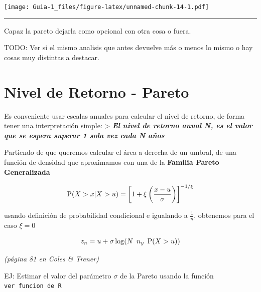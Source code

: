\documentclass[
]{article}
\begin{document}
\texttt{[image: Guia-1\_files/figure-latex/unnamed-chunk-14-1.pdf]}

\begin{center}\rule{0.5\linewidth}{0.5pt}\end{center}

Capaz la pareto dejarla como opcional con otra cosa o fuera.

TODO: Ver si el mismo analisis que antes devuelve más o menos lo mismo o
hay cosas muy distintas a destacar.

\hypertarget{nivel-de-retorno---pareto}{%
\section{Nivel de Retorno - Pareto}\label{nivel-de-retorno---pareto}}

Es conveniente usar escalas anuales para calcular el nivel de retorno,
de forma tener una interpretación simple: \textgreater{}
\textbf{\emph{El nivel de retorno anual N, es el valor que se espera
superar 1 sola vez cada N años}}

Partiendo de que queremos calcular el área a derecha de un umbral, de
una función de densidad que aproximamos con una de la \textbf{Familia
Pareto Generalizada}

\[\Large \mathrm P(X>x | X>u) = \left[ 1 + \xi \left( \frac{x-u}{\sigma} \right) \right]^{-1/\xi}\]

usando definición de probabilidad condicional e igualando a
\(\frac 1 n\), obtenemos para el caso \(\xi=0\)

\[\Large z_n = u + \sigma \log (N \ n_y \ \mathrm P(X>u))\]

\emph{(página 81 en Coles \& Trener)}

EJ: Estimar el valor del parámetro \(\sigma\) de la Pareto usando la
función \texttt{ver\ funcion\ de\ R}
\end{document}
